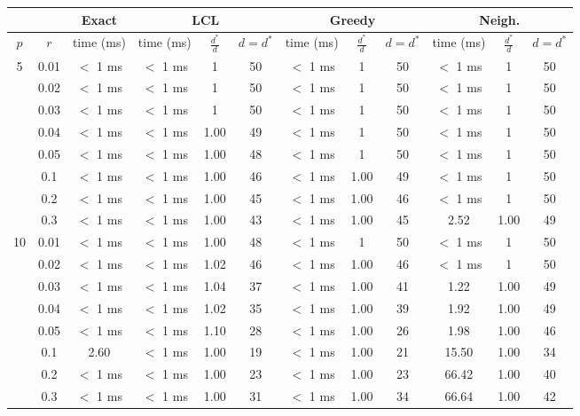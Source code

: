 \begin{tabular}{| c | c | c | c | c | c | c | c | c |  c | c | c | }
	\hline
	& & Exact & \multicolumn{3}{c|}{LCL} & \multicolumn{3}{c|}{Greedy} & \multicolumn{3}{c|}{Neigh.} \\
	\hline
	$p$ & $r$ & time (ms) & time (ms) & $\frac{d^*}{d}$ & $d = d^*$ & time (ms) &  $\frac{d^*}{d}$ & $d = d^*$ & time (ms) &  $\frac{d^*}{d}$ & $d = d^*$ \\
	\hline
	\multirow{8}{*}{5} & 0.01 & $<$ 1 ms & $<$ 1 ms & 1 & 50 & $<$ 1 ms & 1 & 50 & $<$ 1 ms & 1 & 50\\
	\cline{2-12}
	& 0.02 & $<$ 1 ms & $<$ 1 ms & 1 & 50 & $<$ 1 ms & 1 & 50 & $<$ 1 ms & 1 & 50\\
	\cline{2-12}
	& 0.03 & $<$ 1 ms & $<$ 1 ms & 1 & 50 & $<$ 1 ms & 1 & 50 & $<$ 1 ms & 1 & 50\\
	\cline{2-12}
	& 0.04 & $<$ 1 ms & $<$ 1 ms & 1.00 & 49 & $<$ 1 ms & 1 & 50 & $<$ 1 ms & 1 & 50\\
	\cline{2-12}
	& 0.05 & $<$ 1 ms & $<$ 1 ms & 1.00 & 48 & $<$ 1 ms & 1 & 50 & $<$ 1 ms & 1 & 50\\
	\cline{2-12}
	& 0.1 & $<$ 1 ms & $<$ 1 ms & 1.00 & 46 & $<$ 1 ms & 1.00 & 49 & $<$ 1 ms & 1 & 50\\
	\cline{2-12}
	& 0.2 & $<$ 1 ms & $<$ 1 ms & 1.00 & 45 & $<$ 1 ms & 1.00 & 46 & $<$ 1 ms & 1 & 50\\
	\cline{2-12}
	& 0.3 & $<$ 1 ms & $<$ 1 ms & 1.00 & 43 & $<$ 1 ms & 1.00 & 45 & 2.52 & 1.00 & 49\\
	\hline
	\multirow{8}{*}{10} & 0.01 & $<$ 1 ms & $<$ 1 ms & 1.00 & 48 & $<$ 1 ms & 1 & 50 & $<$ 1 ms & 1 & 50\\
	\cline{2-12}
	& 0.02 & $<$ 1 ms & $<$ 1 ms & 1.02 & 46 & $<$ 1 ms & 1.00 & 46 & $<$ 1 ms & 1 & 50\\
	\cline{2-12}
	& 0.03 & $<$ 1 ms & $<$ 1 ms & 1.04 & 37 & $<$ 1 ms & 1.00 & 41 & 1.22 & 1.00 & 49\\
	\cline{2-12}
	& 0.04 & $<$ 1 ms & $<$ 1 ms & 1.02 & 35 & $<$ 1 ms & 1.00 & 39 & 1.92 & 1.00 & 49\\
	\cline{2-12}
	& 0.05 & $<$ 1 ms & $<$ 1 ms & 1.10 & 28 & $<$ 1 ms & 1.00 & 26 & 1.98 & 1.00 & 46\\
	\cline{2-12}
	& 0.1 & 2.60 & $<$ 1 ms & 1.00 & 19 & $<$ 1 ms & 1.00 & 21 & 15.50 & 1.00 & 34\\
	\cline{2-12}
	& 0.2 & $<$ 1 ms & $<$ 1 ms & 1.00 & 23 & $<$ 1 ms & 1.00 & 23 & 66.42 & 1.00 & 40\\
	\cline{2-12}
	& 0.3 & $<$ 1 ms & $<$ 1 ms & 1.00 & 31 & $<$ 1 ms & 1.00 & 34 & 66.64 & 1.00 & 42\\

\end{tabular}
